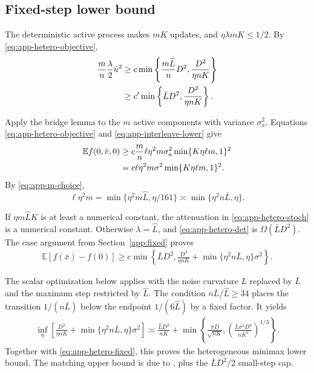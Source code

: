 \documentclass[twoside]{article}
\newcommand{\E}{\mathbb E}
\begin{document}
\subsection{Fixed-step lower bound}

The deterministic active process makes $mK$ updates, and
$\eta\lambda mK\le1/2$. By \eqref{eq:app-hetero-objective},
\begin{align}
 \frac mn\frac\lambda2\bar u^2
 &\ge c\min\left\{\frac{m\widehat L}{n}D^2,
 \frac{D^2}{\eta nK}\right\}\notag\\
 &\ge c'\min\left\{\bar LD^2,\frac{D^2}{\eta nK}\right\}.        \label{eq:app-hetero-det}
\end{align}

Apply the bridge lemma to the $m$ active components with variance
$\sigma_a^2$. Equations \eqref{eq:app-hetero-objective} and
\eqref{eq:app-interleave-lower} give
\begin{align}
 \E f(0,\bar v,0)
 &\ge c\frac mn\ell\eta^2m\sigma_a^2
 \min\{K\eta\ell m,1\}^2\notag\\
 &=c\ell\eta^2m\sigma^2
 \min\{K\eta\ell m,1\}^2.                          \label{eq:app-hetero-stoch}
\end{align}
By \eqref{eq:app-m-choice},
\begin{equation}
 \ell\eta^2m
 =\min\{\eta^2m\widehat L,\eta/161\}
 \asymp\min\{\eta^2n\bar L,\eta\}.                 \label{eq:app-hetero-noise}
\end{equation}

If $\eta m\widehat LK$ is at least a numerical constant, the attenuation in
\eqref{eq:app-hetero-stoch} is a numerical constant. Otherwise
$\lambda=\widehat L$, and \eqref{eq:app-hetero-det} is
$\Omega(\bar LD^2)$. The case argument from Section~\ref{app:fixed} proves
\begin{align}
 \E[f(\bar x)-f(0)]
 \ge c\min\left\{\bar LD^2,\frac{D^2}{\eta nK}
 +\min\{\eta^2n\bar L,\eta\}\sigma^2\right\}.        \label{eq:app-hetero-fixed}
\end{align}

The scalar optimization below applies with the noise curvature $L$ replaced
by $\bar L$ and the maximum step restricted by $\widehat L$. The condition
$n\bar L/\widehat L\ge34$ places the transition $1/(n\bar L)$ below the
endpoint $1/(6\widehat L)$ by a fixed factor. It yields
\begin{align}
 \inf_\eta\left[
 \frac{D^2}{\eta nK}
 +\min\{\eta^2n\bar L,\eta\}\sigma^2\right]
 \asymp \frac{\widehat LD^2}{nK}
 +\min\left\{\frac{\sigma D}{\sqrt{nK}},
 \left(\frac{\bar L\sigma^2D^4}{nK^2}\right)^{1/3}\right\}.
\end{align}
Together with \eqref{eq:app-hetero-fixed}, this proves the heterogeneous
minimax lower bound. The matching upper bound is due to
\citet{liu2026dominates}, plus the $\bar LD^2/2$ small-step cap.
\end{document}
